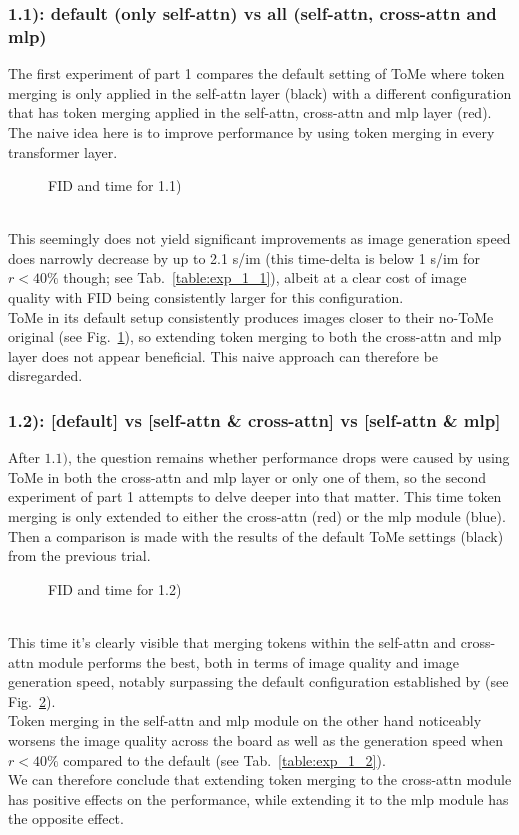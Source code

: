 \subsubsection*{1.1): default (only self-attn) vs all (self-attn, cross-attn and mlp)}
The first experiment of part 1 compares the default setting of ToMe where token merging is only applied in the self-attn layer (black) with a different configuration that has token merging applied in the self-attn, cross-attn and mlp layer (red). 
The naive idea here is to improve performance by using token merging in every transformer layer.
\begin{figure}[!htb]
\label{fig:exp_1_1}
   
   
\caption{FID and time for 1.1)}
\label{fig:exp_1_1}
\end{figure}\\
This seemingly does not yield significant improvements as image generation speed does narrowly decrease by up to 2.1 s/im (this time-delta is below 1 s/im for $r<40\%$ though; see Tab.~\ref{table:exp_1_1}), albeit at a clear cost of image quality with FID being consistently larger for this configuration. \\
ToMe in its default setup consistently produces images closer to their no-ToMe original (see Fig.~\ref{fig:exp_1_1}), so extending token merging to both the cross-attn and mlp layer does not appear beneficial. This naive approach can therefore be disregarded.



\subsubsection*{1.2): [default] vs [self-attn \& cross-attn] vs [self-attn \& mlp]}
After \(1.1)\), the question remains whether performance drops were caused by using ToMe in both the cross-attn and mlp layer or only one of them, so the second experiment of part 1 attempts to delve deeper into that matter. This time token merging is only extended to either the cross-attn (red) or the mlp module (blue). Then a comparison is made with the results of the default ToMe settings (black) from the previous trial.
\begin{figure}[!htb]
    
    
\caption{FID and time for 1.2)}
\label{fig:exp_1_2}
\end{figure}\\
This time it's clearly visible that merging tokens within the self-attn and cross-attn module performs the best, both in terms of image quality and image generation speed, notably surpassing the default configuration established by \cite{bolya2023tomesd} (see Fig.~\ref{fig:exp_1_2}).\\
Token merging in the self-attn and mlp module on the other hand noticeably worsens the image quality across the board as well as the generation speed when $r<40\%$ compared to the default (see Tab.~\ref{table:exp_1_2}).\\
We can therefore conclude that extending token merging to the cross-attn module has positive effects on the performance, while extending it to the mlp module has the opposite effect.



